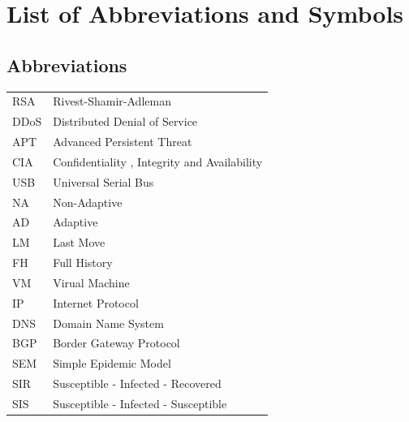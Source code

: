 \documentclass[master=cws, masteroption=vs]{kulemt}
\begin{document}
\listoffiguresandtables
\chapter{List of Abbreviations and Symbols}
\section*{Abbreviations}
\begin{flushleft}
  \renewcommand{\arraystretch}{1.1}
  \begin{tabularx}{\textwidth}{@{}p{12mm}X@{}}
    RSA & Rivest-Shamir-Adleman \\
    DDoS & Distributed Denial of Service \\
    APT & Advanced Persistent Threat \\
    CIA & Confidentiality , Integrity and Availability \\
    USB & Universal Serial Bus \\
    NA & Non-Adaptive \\ 
    AD & Adaptive \\
    LM & Last Move \\
    FH & Full History \\
    VM & Virual Machine \\
    IP & Internet Protocol \\
    DNS & Domain Name System \\
    BGP & Border Gateway Protocol \\
    SEM & Simple Epidemic Model \\
    SIR & Susceptible - Infected - Recovered \\
    SIS & Susceptible - Infected - Susceptible \\
      \end{tabularx}
\end{flushleft}
\end{document}
